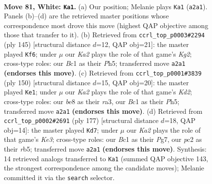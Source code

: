 \documentclass[11pt]{article}
\begin{document}
\clearpage

\begin{figure}[p]\centering
\begin{subfigure}{0.46\textwidth}\centering
\resizebox{\linewidth}{!}{%
\newchessgame
\chessboard[
  setfen={4b1k1/8/1R6/1P6/8/8/K1p3r1/2B5 w - - 5 81},
  showmover=false,
  pgfstyle=straightmove, color=movearrow, markmove={a2-a1}
]}
\caption{}
\end{subfigure}\hfill
\begin{subfigure}{0.46\textwidth}\centering
\resizebox{\linewidth}{!}{%
\newchessgame
\chessboard[
  setfen={8/r4pk1/8/7p/2BR1K1P/8/8/8 b - - 1 73},
  showmover=false,
  pgfstyle=straightmove, color=movearrow, markmove={g7-f6}
]}
\caption{}
\end{subfigure}
\\[4pt]
\begin{subfigure}{0.46\textwidth}\centering
\resizebox{\linewidth}{!}{%
\newchessgame
\chessboard[
  setfen={8/6k1/PR6/7P/8/r4p2/3K4/8 w - - 0 76},
  showmover=false,
  pgfstyle=straightmove, color=movearrow, markmove={d2-e1}
]}
\caption{}
\end{subfigure}\hfill
\begin{subfigure}{0.46\textwidth}\centering
\resizebox{\linewidth}{!}{%
\newchessgame
\chessboard[
  setfen={8/6p1/4k3/1R5P/8/2P3r1/2K5/8 b - - 2 89},
  showmover=false,
  pgfstyle=straightmove, color=movearrow, markmove={e6-d7}
]}
\caption{}
\end{subfigure}
\caption{\textbf{Move 81, White: \texttt{Ka1}.} (a) Our position; Melanie plays \texttt{Ka1} (\texttt{a2a1}). Panels (b)--(d) are the retrieved master positions whose correspondence most drove this move (highest QAP objective among those that transfer to it). (b) Retrieved from \texttt{ccrl\_top\_p0003\#2294} (ply 145) [structural distance $d$=12, QAP obj=21]: the master played \texttt{Kf6}; under $\mu$ our \emph{Ka2} plays the role of that game's \emph{Kg2}; cross-type roles: our \emph{B}c1 as their \emph{P}h5; transferred move \texttt{a2a1} \textbf{(endorses this move)}. (c) Retrieved from \texttt{ccrl\_top\_p0001\#3839} (ply 150) [structural distance $d$=15, QAP obj=20]: the master played \texttt{Ke1}; under $\mu$ our \emph{Ka2} plays the role of that game's \emph{Kd2}; cross-type roles: our \emph{b}e8 as their \emph{r}a3, our \emph{B}c1 as their \emph{P}h5; transferred move \texttt{a2a1} \textbf{(endorses this move)}. (d) Retrieved from \texttt{ccrl\_top\_p0002\#2691} (ply 177) [structural distance $d$=18, QAP obj=14]: the master played \texttt{Kd7}; under $\mu$ our \emph{Ka2} plays the role of that game's \emph{Ke3}; cross-type roles: our \emph{B}c1 as their \emph{P}g7, our \emph{p}c2 as their \emph{r}b5; transferred move \texttt{a2a1} \textbf{(endorses this move)}. Synthesis: 14 retrieved analogs transferred to \texttt{Ka1} (summed QAP objective 143, the strongest correspondence among the candidate moves); Melanie committed it via the \texttt{search} selector.}
\label{fig:thought-m160}
\end{figure}
\end{document}
